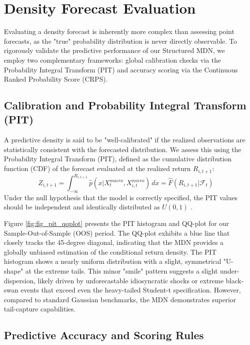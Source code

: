\documentclass[12pt]{article}
\begin{document}
\section{Density Forecast Evaluation}
\label{sec:evaluation}

Evaluating a density forecast is inherently more complex than assessing point forecasts, as the "true" probability distribution is never directly observable. To rigorously validate the predictive performance of our Structured MDN, we employ two complementary frameworks: global calibration checks via the Probability Integral Transform (PIT) and accuracy scoring via the Continuous Ranked Probability Score (CRPS).

\subsection{Calibration and Probability Integral Transform (PIT)}
\label{subsec:pit}

A predictive density is said to be "well-calibrated" if the realized observations are statistically consistent with the forecasted distribution. We assess this using the Probability Integral Transform (PIT), defined as the cumulative distribution function (CDF) of the forecast evaluated at the realized return $R_{i,t+1}$:
\begin{equation}
    Z_{i,t+1} = \int_{-\infty}^{R_{i,t+1}} \hat{p}(x | X_{t}^{macro}, X_{i,t}^{micro}) \, dx = \hat{F}(R_{i,t+1} | \mathcal{F}_t)
\end{equation}
Under the null hypothesis that the model is correctly specified, the PIT values should be independent and identically distributed as $U(0, 1)$ . 



Figure \ref{fig:fig_pit_qqplot} presents the PIT histogram and QQ-plot for our Sample-Out-of-Sample (OOS) period. The QQ-plot exhibits a blue line that closely tracks the 45-degree diagonal, indicating that the MDN provides a globally unbiased estimation of the conditional return density. The PIT histogram shows a nearly uniform distribution with a slight, symmetrical "U-shape" at the extreme tails. This minor "smile" pattern suggests a slight under-dispersion, likely driven by unforecastable idiosyncratic shocks or extreme black-swan events that exceed even the heavy-tailed Student-t specification. However, compared to standard Gaussian benchmarks, the MDN demonstrates superior tail-capture capabilities.

\subsection{Predictive Accuracy and Scoring Rules}
\label{subsec:crps}
\end{document}
